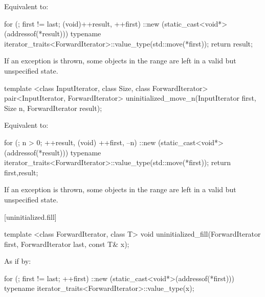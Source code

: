 \begin{itemdescr}
\pnum
\effects
Equivalent to:
\begin{codeblock}
for (; first != last; (void)++result, ++first)
  ::new (static_cast<void*>(addressof(*result)))
    typename iterator_traits<ForwardIterator>::value_type(std::move(*first));
return result;
\end{codeblock}

\pnum
\remarks
If an exception is thrown, some objects in the range 
are left in a valid but unspecified state.
\end{itemdescr}

%
\begin{itemdecl}
template <class InputIterator, class Size, class ForwardIterator>
  pair<InputIterator, ForwardIterator>
    uninitialized_move_n(InputIterator first, Size n, ForwardIterator result);
\end{itemdecl}

\begin{itemdescr}
\pnum
\effects
Equivalent to:
\begin{codeblock}
for (; n > 0; ++result, (void) ++first, --n)
  ::new (static_cast<void*>(addressof(*result)))
    typename iterator_traits<ForwardIterator>::value_type(std::move(*first));
return {first,result};
\end{codeblock}

\pnum
\remarks
If an exception is thrown, some objects in the range 
are left in a valid but unspecified state.
\end{itemdescr}

[uninitialized.fill]{}

%
\begin{itemdecl}
template <class ForwardIterator, class T>
  void uninitialized_fill(ForwardIterator first, ForwardIterator last,
                          const T& x);
\end{itemdecl}

\begin{itemdescr}
\pnum
\effects
As if by:
\begin{codeblock}
for (; first != last; ++first)
  ::new (static_cast<void*>(addressof(*first)))
    typename iterator_traits<ForwardIterator>::value_type(x);
\end{codeblock}
\end{itemdescr}


